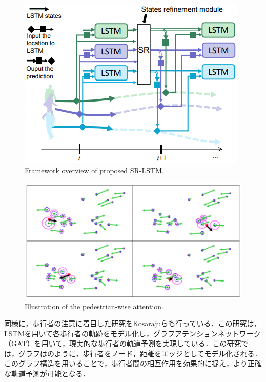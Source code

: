 
\begin{figure}[hbtp]
     \centering
    \includegraphics[keepaspectratio, scale=0.63]
         {images/sr-lstm-str.png}
    \caption{Framework overview of proposed SR-LSTM.\protect\footnotemark[2]}
    \label{Fig:sr-lstm-str}
\end{figure}

\begin{figure}[hbtp]
     \centering
    \includegraphics[keepaspectratio, scale=0.63]
         {images/sr-lstm.png}
    \caption{Illustration of the pedestrian-wise attention.\protect\footnotemark[2]}
    \label{Fig:sr-lstm}
\end{figure}

\protect{}

同様に，歩行者の注意に着目した研究をKosarajuら\cite{s-bigat}も行っている．この研究は，LSTMを用いて各歩行者の軌跡をモデル化し，グラフアテンションネットワーク（GAT）を用いて，現実的な歩行者の軌道予測を実現している．この研究では，グラフはのように，歩行者をノード，距離をエッジとしてモデル化される．このグラフ構造を用いることで，歩行者間の相互作用を効果的に捉え，より正確な軌道予測が可能となる．

